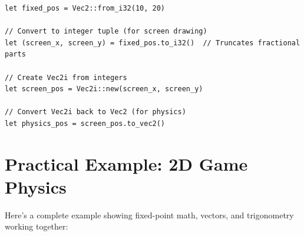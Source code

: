 \begin{lstlisting}
let fixed_pos = Vec2::from_i32(10, 20)

// Convert to integer tuple (for screen drawing)
let (screen_x, screen_y) = fixed_pos.to_i32()  // Truncates fractional parts

// Create Vec2i from integers
let screen_pos = Vec2i::new(screen_x, screen_y)

// Convert Vec2i back to Vec2 (for physics)
let physics_pos = screen_pos.to_vec2()
\end{lstlisting}

\section{Practical Example: 2D Game Physics}
\label{sec:math-example}

Here's a complete example showing fixed-point math, vectors, and trigonometry working together:

